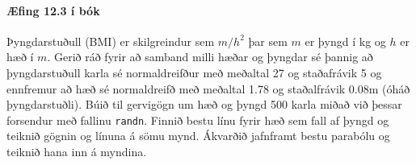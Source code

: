 \documentclass{article}
\begin{document}
\question

\paragraph{Æfing 12.3 í bók} Þyngdarstuðull (BMI) er skilgreindur sem $m/h^2$ þar sem $m$ er þyngd í kg og $h$ er hæð í $m$. Gerið ráð fyrir að samband milli hæðar og þyngdar sé þannig að þyngdarstuðull karla sé normaldreifður með meðaltal 27 og staðafrávik 5 og ennfremur að hæð sé normaldreifð með meðaltal 1.78 og staðalfrávik 0.08m (óháð þyngdarstuðli). Búið til gervigögn um hæð og þyngd 500 karla miðað við þessar forsendur með fallinu \texttt{randn}. Finnið bestu línu fyrir hæð sem fall af þyngd og teiknið gögnin og línuna á sömu mynd. Ákvarðið jafnframt bestu parabólu og teiknið hana inn á myndina.
\end{document}
